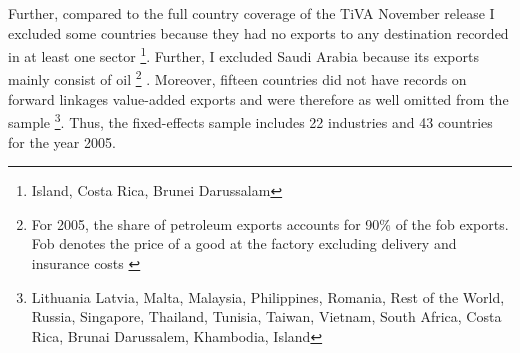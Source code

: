 Further, compared to the full country coverage of the TiVA November release I excluded some countries because they had no exports to any destination recorded in at least one sector \footnote{ Island, Costa Rica, Brunei Darussalam}. %
Further, I excluded Saudi Arabia because its exports mainly consist of oil \footnote{ For 2005, the share of petroleum exports accounts for  90\% of the fob exports. Fob denotes the price of a good at the factory excluding delivery and insurance costs \parencite[p.78]{combes}} \parencite{opec}. Moreover, fifteen  countries did not have records on forward linkages value-added exports and were therefore as well omitted from the sample \footnote{Lithuania Latvia, Malta, Malaysia, Philippines, Romania, Rest of the World, Russia, Singapore, Thailand, Tunisia, Taiwan, Vietnam, South Africa, Costa Rica, Brunai Darussalem, Khambodia, Island}.  Thus, the fixed-effects sample includes 22 industries and 43 countries for the year 2005.  
\endinput
